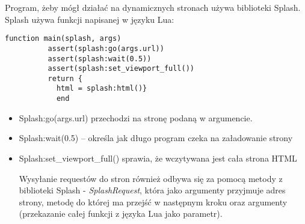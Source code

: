Program, żeby mógł działać na dynamicznych stronach używa biblioteki Splash.
Splash używa funkcji napisanej w języku Lua:
\begin{lstlisting}
function main(splash, args)
          assert(splash:go(args.url))
          assert(splash:wait(0.5))
          assert(splash:set_viewport_full())
          return {
            html = splash:html()}
            end
\end{lstlisting}
\begin{itemize}
\item[] Splash:go(args.url) przechodzi na stronę podaną w argumencie.
\item[] Splash:wait(0.5) – określa jak długo program czeka na załadowanie strony
\item[] Splash:set\_viewport\_full() sprawia, że wczytywana jest cała strona HTML


Wysyłanie requestów do stron również odbywa się za pomocą metody z biblioteki Splash - \emph{SplashRequest}, która jako argumenty przyjmuje adres strony, metodę do której ma przejść w następnym kroku oraz argumenty (przekazanie całej funkcji z języka Lua jako parametr).
\end{itemize}

